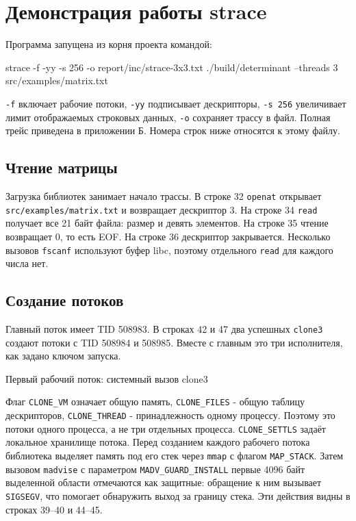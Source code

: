 \documentclass[12pt,a4paper]{article}
\begin{document}
\section{Демонстрация работы strace}
Программа запущена из корня проекта командой:
\begin{terminal}
strace -f -yy -s 256 -o report/inc/strace-3x3.txt ./build/determinant --threads 3 src/examples/matrix.txt
\end{terminal}

\texttt{-f} включает рабочие потоки, \texttt{-yy} подписывает дескрипторы, \texttt{-s 256} увеличивает лимит отображаемых строковых данных, \texttt{-o} сохраняет трассу в файл. Полная трейс приведена в приложении Б. Номера строк ниже относятся к этому файлу.

\subsection{Чтение матрицы}
Загрузка библиотек занимает начало трассы. В строке 32 \texttt{openat} открывает \texttt{src/examples/matrix.txt} и возвращает дескриптор 3. На строке 34 \texttt{read} получает все 21 байт файла: размер и девять элементов. На строке 35 чтение возвращает 0, то есть EOF. На строке 36 дескриптор закрывается. Несколько вызовов \texttt{fscanf} используют буфер libc, поэтому отдельного \texttt{read} для каждого числа нет.

\subsection{Создание потоков}
Главный поток имеет TID 508983. В строках 42 и 47 два успешных \texttt{clone3} создают потоки с TID 508984 и 508985. Вместе с главным это три исполнителя, как задано ключом запуска.
\begin{listingblock}{Первый рабочий поток: системный вызов clone3}
\end{listingblock}

Флаг \texttt{CLONE\_VM} означает общую память, \texttt{CLONE\_FILES} - общую таблицу дескрипторов, \texttt{CLONE\_THREAD} - принадлежность одному процессу. Поэтому это потоки одного процесса, а не три отдельных процесса. \texttt{CLONE\_SETTLS} задаёт локальное хранилище потока. Перед созданием каждого рабочего потока библиотека выделяет память под его стек через \texttt{mmap} с флагом \texttt{MAP\_STACK}. Затем вызовом \texttt{madvise} с параметром \texttt{MADV\_GUARD\_INSTALL} первые 4096 байт выделенной области отмечаются как защитные: обращение к ним вызывает \texttt{SIGSEGV}, что помогает обнаружить выход за границу стека. Эти действия видны в строках 39--40 и 44--45.
\end{document}
